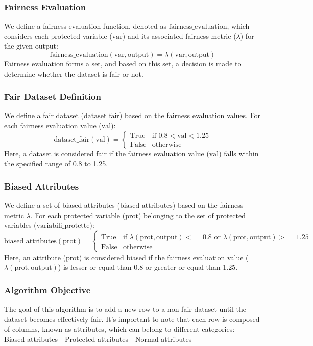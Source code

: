 \documentclass[12pt,a4paper,openright,twoside]{book}
\begin{document}
\subsubsection{Fairness Evaluation}
We define a fairness evaluation function, denoted as \( \text{fairness\_evaluation} \), which considers each protected variable (\( \text{var} \)) and its associated fairness metric (\( \lambda \)) for the given output:
\[ \text{fairness\_evaluation}(\text{var}, \text{output}) = \lambda(\text{var}, \text{output}) \]
Fairness evaluation forms a set, and based on this set, a decision is made to determine whether the dataset is fair or not.

\subsubsection{Fair Dataset Definition}
We define a fair dataset (\( \text{dataset\_fair} \)) based on the fairness evaluation values. For each fairness evaluation value (\( \text{val} \)):
\[ \text{dataset\_fair}(\text{val}) = \begin{cases} 
      \text{True} & \text{if } 0.8 < \text{val} < 1.25 \\
      \text{False} & \text{otherwise}
   \end{cases}
\]
Here, a dataset is considered fair if the fairness evaluation value (\( \text{val} \)) falls within the specified range of 0.8 to 1.25.

\subsubsection{Biased Attributes}
We define a set of biased attributes (\( \text{biased\_attributes} \)) based on the fairness metric \( \lambda \). For each protected variable (\( \text{prot} \)) belonging to the set of protected variables (\( \text{variabili\_protette} \)):
\[ \text{biased\_attributes}(\text{prot}) = \begin{cases} 
      \text{True} & \text{if } \lambda(\text{prot}, \text{output}) <= 0.8 \text{ or } \lambda(\text{prot}, \text{output}) >= 1.25 \\
      \text{False} & \text{otherwise}
   \end{cases}
\]
Here, an attribute (\( \text{prot} \)) is considered biased if the fairness evaluation value (\( \lambda(\text{prot}, \text{output}) \)) is lesser or equal than 0.8 or greater or equal than 1.25.

\subsubsection{Algorithm Objective}
The goal of this algorithm is to add a new row to a non-fair dataset until the dataset becomes effectively fair. It's important to note that each row is composed of columns, known as attributes, which can belong to different categories:
- Biased attributes
- Protected attributes
- Normal attributes
\end{document}
